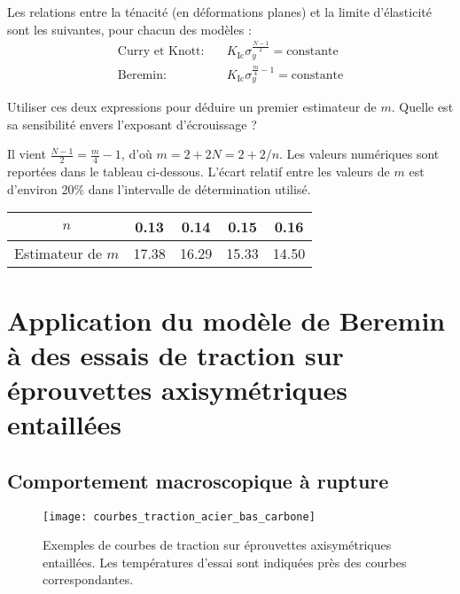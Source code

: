 \begin{questions}
Les relations entre la ténacité (en déformations planes) et la limite d’élasticité sont les suivantes, pour
chacun des modèles :
\begin{align*}
\text{Curry et Knott:}\quad & K_\text{Ic}\sigma_y^{\frac{N-1}{2}} = \text{constante}\\
\text{Beremin:}\quad & K_\text{Ic}\sigma_y^{\frac{m}{4}-1} = \text{constante}
\end{align*}

\question Utiliser ces deux expressions pour déduire un premier estimateur de $m$. Quelle est sa sensibilité
envers l’exposant d’écrouissage ?
\begin{solution}
Il vient $\frac{N-1}{2} = \frac{m}{4}-1$, d’où $m=2+2N=2+2/n$. Les valeurs numériques sont reportées dans le
tableau ci-dessous. L’écart relatif entre les valeurs de $m$ est d’environ 20\% dans l’intervalle de détermination
utilisé.

\begin{R_table}
\begin{tabular}{|c|c|c|c|c|}
\hline 
$n$ & 0.13 & 0.14 & 0.15 & 0.16 \\ 
\hline 
Estimateur de $m$ & 17.38 & 16.29 & 15.33 & 14.50 \\ 
\hline 
\end{tabular}
\end{R_table} 
\end{solution}
\end{questions}

\section{Application du modèle de Beremin à des essais de traction sur éprouvettes axisymétriques entaillées}

\subsection{Comportement macroscopique à rupture}

\begin{figure}
\begin{center}
\texttt{[image: courbes\_traction\_acier\_bas\_carbone]}
\end{center}
\caption{Exemples de courbes de traction sur éprouvettes axisymétriques entaillées. Les
températures d’essai sont indiquées près des courbes correspondantes.}\label{fig:traction-acier}
\end{figure}

